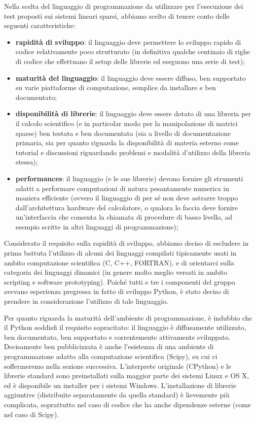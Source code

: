 \documentclass[11pt,a4paper]{scrartcl}
\begin{document}
Nella scelta del linguaggio di programmazione da utilizzare per l'esecuzione dei test proposti sui sistemi lineari sparsi, abbiamo scelto di tenere conto delle seguenti caratteristiche:
\begin{itemize}
	\item \textbf{rapidità di sviluppo}: il linguaggio deve permettere lo sviluppo rapido di codice relativamente poco strutturato (in definitiva qualche centinaio di righe di codice che effettuano il setup delle librerie ed eseguono una serie di test);
	\item \textbf{maturità del linguaggio}: il linguaggio deve essere diffuso, ben supportato su varie piattaforme di computazione, semplice da installare e ben documentato;
	\item \textbf{disponibilità di librerie}: il linguaggio deve essere dotato di una libreria per il calcolo scientifico (e in particolar modo per la manipolazione di matrici sparse) ben testata e ben documentata (sia a livello di documentazione primaria, sia per quanto riguarda la disponibilità di materia esterno come tutorial e discussioni riguardando problemi e modalità d'utilizzo della libreria stessa);
	\item \textbf{performances}: il linguaggio (e le sue librerie) devono fornire gli strumenti adatti a performare computazioni di natura pesantamente numerica in maniera efficiente (ovvero il linguaggio di per sé non deve astrarre troppo dall'architettura hardware del calcolatore, o qualora lo faccia deve fornire un'interfaccia che consenta la chiamata di procedure di basso livello, ad esempio scritte in altri linguaggi di programmazione);
\end{itemize}

Considerato il requisito sulla rapidità di sviluppo, abbiamo deciso di escludere in prima battuta l'utilizzo di alcuni dei linguaggi compilati tipicamente usati in ambito computazione scientifica (C, C++, FORTRAN), e di orientarci sulla categoria dei linguaggi dinamici (in genere molto meglio versati in ambito scripting e software prototyping). Poiché tutti e tre i componenti del gruppo avevano esperienza pregressa in fatto di sviluppo Python, è stato deciso di prendere in considerazione l'utilizzo di tale linguaggio.

Per quanto riguarda la maturità dell'ambiente di programmazione, è indubbio che il Python soddisfi il requisito sopracitato: il linguaggio è diffusamente utilizzato, ben documentato, ben supportato e correntemente attivamente sviluppato. Decisamente ben pubblicizzata è anche l'esistenza di una ambiente di programmazione adatto alla computazione scientifica (Scipy), su cui ci soffermeremo nella sezione successiva. L'interprete originale (CPython) e le librerie standard sono preinstallati sulla maggior parte dei sistemi Linux e OS X, ed è disponibile un installer per i sistemi Windows. L'installazione di librerie aggiuntive (distribuite separatamente da quella standard) è lievemente più complicata, soprattutto nel caso di codice che ha anche dipendenze esterne (come nel caso di Scipy).
\end{document}
